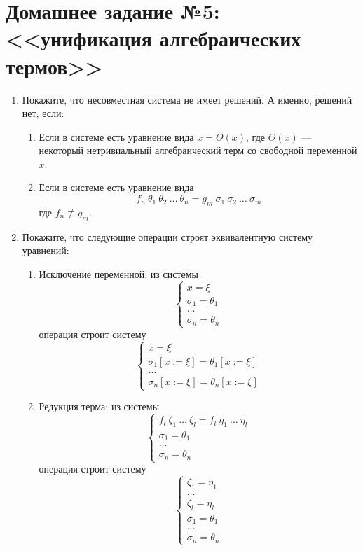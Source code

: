 \documentclass[10pt,a4paper,oneside]{article}
\begin{document}
\section*{Домашнее задание №5: <<унификация алгебраических термов>>}
\begin{enumerate}

\item Покажите, что несовместная система не имеет решений. А именно, решений нет, если:
\begin{enumerate}
\item Если в системе есть уравнение вида $x = \Theta(x)$, где $\Theta(x)$ --- некоторый
нетривиальный алгебраический терм со свободной переменной $x$.
\item Если в системе есть уравнение вида $$f_n\ \theta_1\ \theta_2\ \dots\ \theta_n = g_m\ \sigma_1\ \sigma_2\ \dots\ \sigma_m$$
где $f_n \not\equiv g_m$.
\end{enumerate}

\item Покажите, что следующие операции строят эквивалентную систему уравнений:
\begin{enumerate}
\item Исключение переменной: из системы 
$$\left\{
\begin{array}{l}x = \xi\\\sigma_1 = \theta_1\\\dots\\\sigma_n=\theta_n\end{array}\right.$$
операция строит систему
$$\left\{
\begin{array}{l}x = \xi\\\sigma_1[x := \xi] = \theta_1[x := \xi]\\\dots\\\sigma_n[x:=\xi]=\theta_n[x := \xi]
\end{array}\right.$$

\item Редукция терма: из системы 
$$\left\{
\begin{array}{l}f_l\ \zeta_1\ \dots\ \zeta_l = f_l\ \eta_1\ \dots\ \eta_l\\
\sigma_1 = \theta_1\\\dots\\\sigma_n=\theta_n\end{array}\right.$$
операция строит систему
$$\left\{
\begin{array}{l}\zeta_1 = \eta_1\\\dots\\\zeta_l = \eta_l\\
\sigma_1 = \theta_1\\\dots\\\sigma_n=\theta_n\end{array}\right.$$


\end{enumerate}
\end{enumerate}
\end{document}
